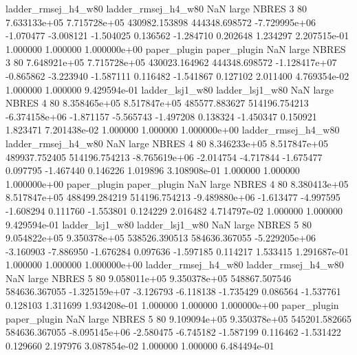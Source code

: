 ladder_rmsej_h4_w80 ladder_rmsej_h4_w80                   NaN      large    NBRES                 3 80 7.633133e+05   7.715728e+05 430982.153898  444348.698572 -7.729995e+06     -1.070477     -3.008121    -1.504025       0.136562 -1.284710   0.202648     1.234297   2.207515e-01            1.000000        1.000000        1.000000e+00
       paper_plugin        paper_plugin                   NaN      large    NBRES                 3 80 7.648921e+05   7.715728e+05 430023.164962  444348.698572 -1.128417e+07     -0.865862     -3.223940    -1.587111       0.116482 -1.541867   0.127102     2.011400   4.769354e-02            1.000000        1.000000        9.429594e-01
    ladder_lsj1_w80     ladder_lsj1_w80                   NaN      large    NBRES                 4 80 8.358465e+05   8.517847e+05 485577.883627  514196.754213 -6.374158e+06     -1.871157     -5.565743    -1.497208       0.138324 -1.450347   0.150921     1.823471   7.201438e-02            1.000000        1.000000        1.000000e+00
ladder_rmsej_h4_w80 ladder_rmsej_h4_w80                   NaN      large    NBRES                 4 80 8.346233e+05   8.517847e+05 489937.752405  514196.754213 -8.765619e+06     -2.014754     -4.717844    -1.675477       0.097795 -1.467440   0.146226     1.019896   3.108908e-01            1.000000        1.000000        1.000000e+00
       paper_plugin        paper_plugin                   NaN      large    NBRES                 4 80 8.380413e+05   8.517847e+05 488499.284219  514196.754213 -9.489880e+06     -1.613477     -4.997595    -1.608294       0.111760 -1.553801   0.124229     2.016482   4.714797e-02            1.000000        1.000000        9.429594e-01
    ladder_lsj1_w80     ladder_lsj1_w80                   NaN      large    NBRES                 5 80 9.054822e+05   9.350378e+05 538526.390513  584636.367055 -5.229205e+06     -3.160903     -7.886950    -1.676284       0.097636 -1.597185   0.114217     1.533415   1.291687e-01            1.000000        1.000000        1.000000e+00
ladder_rmsej_h4_w80 ladder_rmsej_h4_w80                   NaN      large    NBRES                 5 80 9.058011e+05   9.350378e+05 548867.507546  584636.367055 -1.325159e+07     -3.126793     -6.118138    -1.735429       0.086564 -1.537761   0.128103     1.311699   1.934208e-01            1.000000        1.000000        1.000000e+00
       paper_plugin        paper_plugin                   NaN      large    NBRES                 5 80 9.109094e+05   9.350378e+05 545201.582665  584636.367055 -8.095145e+06     -2.580475     -6.745182    -1.587199       0.116462 -1.531422   0.129660     2.197976   3.087854e-02            1.000000        1.000000        6.484494e-01
